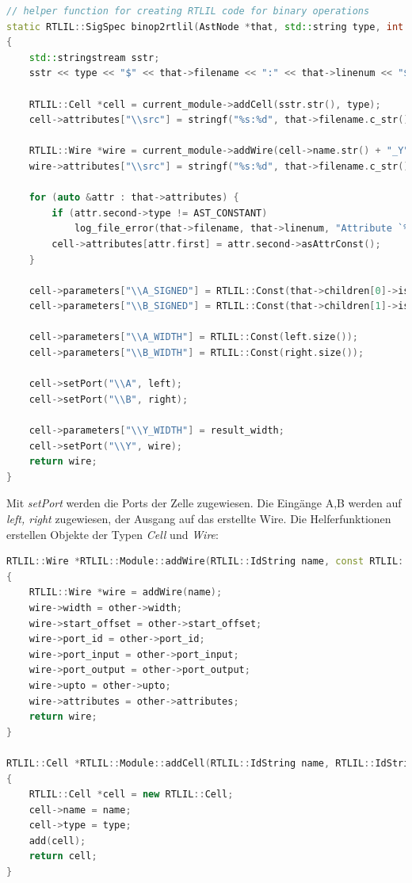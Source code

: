 \documentclass[11pt]{report}
\begin{document}
\begin{lstlisting}[language=C++]
// helper function for creating RTLIL code for binary operations
static RTLIL::SigSpec binop2rtlil(AstNode *that, std::string type, int result_width, const RTLIL::SigSpec &left, const RTLIL::SigSpec &right)
{
	std::stringstream sstr;
	sstr << type << "$" << that->filename << ":" << that->linenum << "$" << (autoidx++);

	RTLIL::Cell *cell = current_module->addCell(sstr.str(), type);
	cell->attributes["\\src"] = stringf("%s:%d", that->filename.c_str(), that->linenum);

	RTLIL::Wire *wire = current_module->addWire(cell->name.str() + "_Y", result_width);
	wire->attributes["\\src"] = stringf("%s:%d", that->filename.c_str(), that->linenum);

	for (auto &attr : that->attributes) {
		if (attr.second->type != AST_CONSTANT)
			log_file_error(that->filename, that->linenum, "Attribute `%s' with non-constant value!\n", attr.first.c_str());
		cell->attributes[attr.first] = attr.second->asAttrConst();
	}

	cell->parameters["\\A_SIGNED"] = RTLIL::Const(that->children[0]->is_signed);
	cell->parameters["\\B_SIGNED"] = RTLIL::Const(that->children[1]->is_signed);

	cell->parameters["\\A_WIDTH"] = RTLIL::Const(left.size());
	cell->parameters["\\B_WIDTH"] = RTLIL::Const(right.size());

	cell->setPort("\\A", left);
	cell->setPort("\\B", right);

	cell->parameters["\\Y_WIDTH"] = result_width;
	cell->setPort("\\Y", wire);
	return wire;
}
\end{lstlisting}
Mit \textit{setPort} werden die Ports der Zelle zugewiesen. Die Eingänge A,B werden auf \textit{left, right} zugewiesen, der Ausgang auf das erstellte Wire.
Die Helferfunktionen erstellen Objekte der Typen \textit{Cell} und \textit{Wire}:
\begin{lstlisting}[language=C++]
RTLIL::Wire *RTLIL::Module::addWire(RTLIL::IdString name, const RTLIL::Wire *other)
{
	RTLIL::Wire *wire = addWire(name);
	wire->width = other->width;
	wire->start_offset = other->start_offset;
	wire->port_id = other->port_id;
	wire->port_input = other->port_input;
	wire->port_output = other->port_output;
	wire->upto = other->upto;
	wire->attributes = other->attributes;
	return wire;
}

RTLIL::Cell *RTLIL::Module::addCell(RTLIL::IdString name, RTLIL::IdString type)
{
	RTLIL::Cell *cell = new RTLIL::Cell;
	cell->name = name;
	cell->type = type;
	add(cell);
	return cell;
}
\end{lstlisting}
\end{document}
